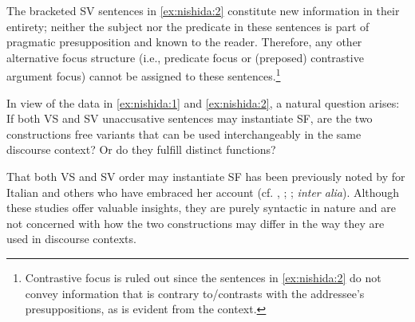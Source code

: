 \documentclass[output=paper,colorlinks,citecolor=brown,
]{langscibook}
\begin{document}
The bracketed SV sentences in \ref{ex:nishida:2} constitute new information in their entirety; neither the subject nor the predicate in these sentences is part of pragmatic presupposition and known to the reader. Therefore, any other alternative focus structure (i.e., predicate focus or (preposed) contrastive argument focus) cannot be assigned to these sentences.\footnote{Contrastive focus is ruled out since the sentences in \ref{ex:nishida:2} do not convey information that is contrary to/contrasts with the addressee's presuppositions, as is evident from the context.}

In view of the data in \ref{ex:nishida:1} and \ref{ex:nishida:2}, a natural question arises: If both VS and SV unaccusative sentences may instantiate SF, are the two constructions free variants that can be used interchangeably in the same discourse context? Or do they fulfill distinct functions? 


That both VS and SV order may instantiate SF has been previously noted by \citet{pinto1997} for Italian and others who have embraced her account (cf. \citeauthor{Sheehan2006} \citeyear{Sheehan2006}, \citeyear{Sheehan2010}; \citeauthor{corr2016wide} \citeyear{corr2016wide}; \textit{inter alia}). Although these studies offer valuable insights, they are purely syntactic in nature and are not concerned with how the two constructions may differ in the way they are used in discourse contexts.  
\end{document}
